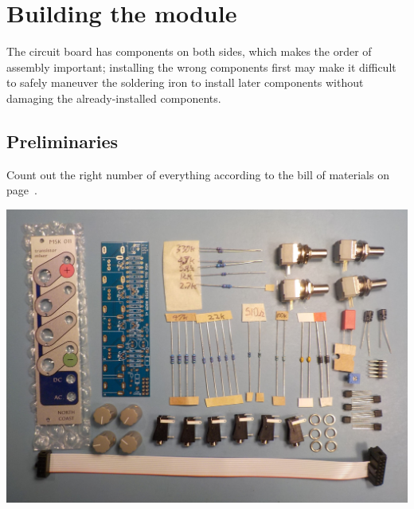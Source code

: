 
%
%
%
%
%
%

\chapter{Building the module}

The circuit board  has components on both sides, which makes the order of
assembly important; installing the wrong components first may make it
difficult to safely maneuver the soldering iron to install later components
without damaging the already-installed components.

\section{Preliminaries}

Count out the right number of everything according to the bill of materials
on page~\pageref{cha:bom}. 

\noindent\includegraphics[width=\linewidth]{module-parts.jpg}

